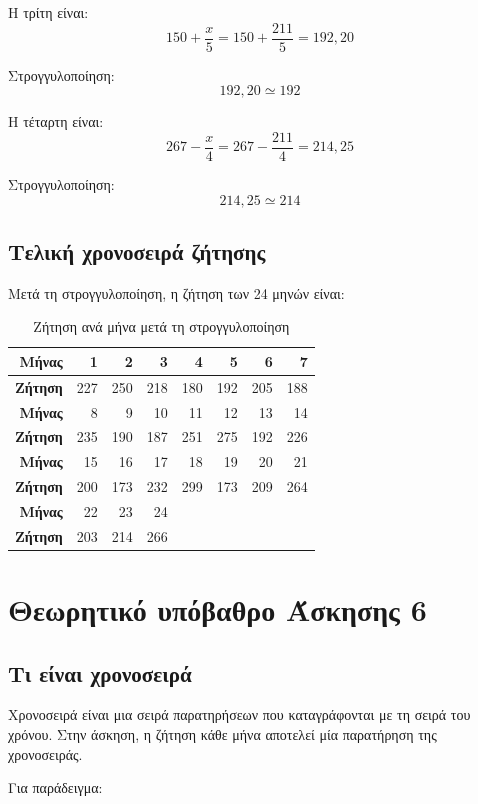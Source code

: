 \documentclass[12pt,a4paper]{article}
\begin{document}
Η τρίτη είναι:
\[
150+\frac{x}{5}=150+\frac{211}{5}=192{,}20
\]

Στρογγυλοποίηση:
\[
192{,}20 \simeq 192
\]

Η τέταρτη είναι:
\[
267-\frac{x}{4}=267-\frac{211}{4}=214{,}25
\]

Στρογγυλοποίηση:
\[
214{,}25 \simeq 214
\]

\subsection{Τελική χρονοσειρά ζήτησης}

Μετά τη στρογγυλοποίηση, η ζήτηση των 24 μηνών είναι:

\begin{table}[H]
\centering
\caption{Ζήτηση ανά μήνα μετά τη στρογγυλοποίηση}
\small
\begin{tabular}{rrrrrrrr}
\toprule
\textbf{Μήνας} & 1 & 2 & 3 & 4 & 5 & 6 & 7 \\
\midrule
\textbf{Ζήτηση} & 227 & 250 & 218 & 180 & 192 & 205 & 188 \\
\midrule
\textbf{Μήνας} & 8 & 9 & 10 & 11 & 12 & 13 & 14 \\
\midrule
\textbf{Ζήτηση} & 235 & 190 & 187 & 251 & 275 & 192 & 226 \\
\midrule
\textbf{Μήνας} & 15 & 16 & 17 & 18 & 19 & 20 & 21 \\
\midrule
\textbf{Ζήτηση} & 200 & 173 & 232 & 299 & 173 & 209 & 264 \\
\midrule
\textbf{Μήνας} & 22 & 23 & 24 & & & & \\
\midrule
\textbf{Ζήτηση} & 203 & 214 & 266 & & & & \\
\bottomrule
\end{tabular}
\end{table}

\section{Θεωρητικό υπόβαθρο Άσκησης 6}

\subsection{Τι είναι χρονοσειρά}

Χρονοσειρά είναι μια σειρά παρατηρήσεων που καταγράφονται με τη σειρά του χρόνου. Στην άσκηση, η ζήτηση κάθε μήνα αποτελεί μία παρατήρηση της χρονοσειράς.

Για παράδειγμα:
\end{document}
